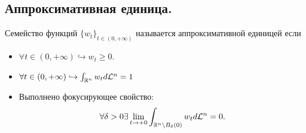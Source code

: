 \subsection{Аппроксимативная единица.}
\begin{definition}
    Семейство функций $\{w_t\}_{t \in (0, +\infty)}$ называется аппроксимативной единицей если
    \begin{itemize}
        \item $\forall t \in (0, +\infty) \hookrightarrow w_t \geq 0$.
        \item $\forall t \in (0, +\infty) \hookrightarrow \int_{\mathbb{R}^n} w_t d\mathcal{L}^n = 1$
        \item Выполнено фокусирующее свойство: \[\forall \delta > 0  \exists \lim\limits_{t \rightarrow +0} \int_{\mathbb{R}^n \setminus B_\delta(0)} w_{t}d\mathcal{L}^n = 0.\]
    \end{itemize}
\end{definition}
